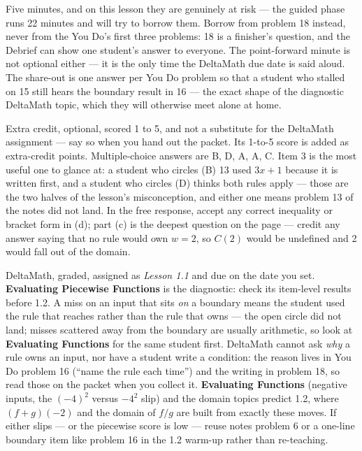 \documentclass[10pt]{article}
\begin{document}
\begin{teachernote}[Debrief]
Five minutes, and on this lesson they are genuinely at risk --- the guided phase
runs 22 minutes and will try to borrow them. Borrow from problem 18 instead,
never from the You Do's first three problems: 18 is a finisher's question, and the
Debrief can show one student's answer to everyone. The point-forward minute is not
optional either --- it is the only time the DeltaMath due date is said aloud. The
share-out is one answer per You Do problem so that a student who stalled on 15
still hears the boundary result in 16 --- the exact shape of the diagnostic
DeltaMath topic, which they will otherwise meet alone at home.
\end{teachernote}

\begin{teachernote}[AP Practice]
Extra credit, optional, scored 1 to 5, and not a substitute for the DeltaMath assignment --- say so
when you hand out the packet. Its 1-to-5 score is added as extra-credit points. Multiple-choice answers are B, D, A, A,
C. Item 3 is the most useful one to glance at: a student who circles (B) 13 used
$3x + 1$ because it is written first, and a student who circles (D) thinks both
rules apply --- those are the two halves of the lesson's misconception, and either
one means problem 13 of the notes did not land. In the free response, accept any
correct inequality or bracket form in (d); part (c) is the deepest question on the
page --- credit any answer saying that no rule would own $w = 2$, so $C(2)$ would be
undefined and 2 would fall out of the domain.
\end{teachernote}

\begin{teachernote}[Homework]
DeltaMath, graded, assigned as \textit{Lesson 1.1} and due on the date you set.
\textbf{Evaluating Piecewise Functions} is the diagnostic: check its item-level
results before 1.2. A miss on an input that sits \emph{on} a boundary means the
student used the rule that reaches rather than the rule that owns --- the open
circle did not land; misses scattered away from the boundary are usually
arithmetic, so look at \textbf{Evaluating Functions} for the same student first.
DeltaMath cannot ask \emph{why} a rule owns an input, nor have a student write a
condition: the reason lives in You Do problem 16 (``name the rule each time'') and
the writing in problem 18, so read those on the packet when you collect it.
\textbf{Evaluating Functions} (negative inputs, the $(-4)^2$ versus $-4^2$ slip) and
the domain topics predict 1.2, where $(f+g)(-2)$ and the domain of $f/g$ are built
from exactly these moves. If either slips --- or the piecewise score is low ---
reuse notes problem 6 or a one-line boundary item like problem 16 in the 1.2
warm-up rather than re-teaching.
\end{teachernote}
\end{document}
